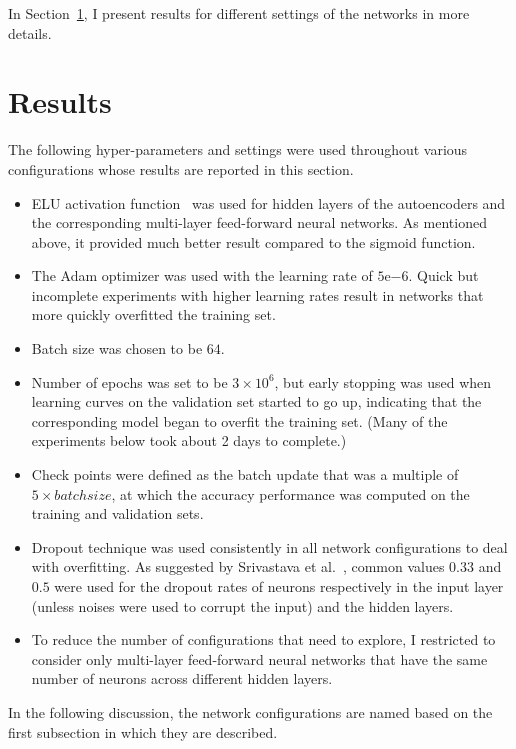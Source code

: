 \documentclass[12pt]{article}
\begin{document}
In Section~\ref{sec:results}, I present results for different settings of the networks in more details.

\section{Results}
\label{sec:results}

\noindent
The following hyper-parameters and settings were used throughout various configurations whose results are reported in this section.
\begin{itemize}
\item ELU activation function~\cite{clevert2015fast} was used for hidden layers of the autoencoders and the corresponding multi-layer feed-forward neural networks. As mentioned above, it provided much better result compared to the sigmoid function.
\item The Adam optimizer was used with the learning rate of $5\mathrm{e}{-6}$. Quick but incomplete experiments with higher learning rates result in networks that more quickly overfitted the training set.
\item Batch size was chosen to be $64$.
\item Number of epochs was set to be $3\times10^6$, but early stopping was used when learning curves on the validation set started to go up, indicating that the corresponding model began to overfit the training set. (Many of the experiments below took about 2 days to complete.)
\item Check points were defined as the batch update that was a multiple of $5 \times batchsize$, at which the accuracy performance was computed on the training and validation sets.
\item Dropout technique was used consistently in all network configurations to deal with overfitting. As suggested by Srivastava et al.~\cite{srivastava2014dropout}, common values $0.33$ and $0.5$ were used for the dropout rates of neurons respectively in the input layer (unless noises were used to corrupt the input) and the hidden layers.
\item To reduce the number of configurations that need to explore, I restricted to consider only multi-layer feed-forward neural networks that have the same number of neurons across different hidden layers.
\end{itemize}

In the following discussion, the network configurations are named based on the first subsection in which they are described.
\end{document}

